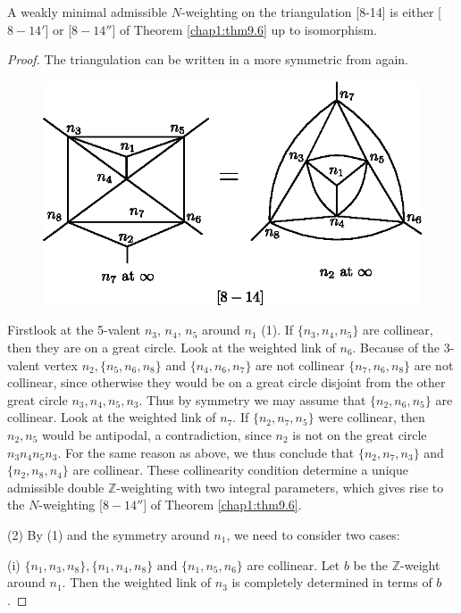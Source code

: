 \begin{lemma}\label{chap1:lem9.21}
A weakly minimal admissible $N$-weighting on the triangulation [8-14]
is either [$8-14'$] or [$8-14''$] of Theorem \ref{chap1:thm9.6} up to
isomorphism.  
\end{lemma}

\begin{proof}
The triangulation can be written in a more symmetric from again. 
\begin{figure}[H]
\centering 
\includegraphics[scale=0.75]{vol58-fig/fig58-56.eps} 
\end{figure}

First\pageoriginale  look at the 5-valent $n_3$, $n_4$, $n_5$ around
$n_1$ (1). If $\{n_3, 
n_4, n_5\}$ are collinear, then they are on a great circle. Look at
the weighted link of $n_6$. Because of the 3-valent vertex $n_2,
\{n_5, n_6, n_8\}$ and $\{n_4, n_6, n_7\}$ are not collinear $\{n_7,
n_6, n_8\}$ are not collinear, since otherwise they would be on a
great circle disjoint from the other great circle $n_3, n_4, n_5,
n_3$. Thus by  symmetry we may assume that $\{n_2, n_6, n_5 \}$ are
collinear. Look at the weighted link of $n_7$. If $\{n_2, n_7, n_5 \}$
were collinear, then $n_2, n_5$ would be antipodal, a contradiction,
since $n_2$ is not on the great circle $n_3 n_4 n_5 n_3$. For the same
reason as above, we thus conclude that $\{n_2, n_7, n_3\}$ and $\{n_2,
n_8, n_4\}$ are collinear. These collinearity condition determine a
unique admissible double $\mathbb{Z}$-weighting with two integral
parameters, which gives rise to the $N$-weighting [$8-14''$] of Theorem
\ref{chap1:thm9.6}.  

(2) By (1) and the symmetry around $n_1$, we need to consider two
cases: 

(i) $\{n_1, n_3, n_8\}, \{n_1, n_4, n_8\} \text{ and }\{n_1, n_5,
n_6\}$ are collinear. Let $b$ be the $\mathbb{Z}$-weight around
$n_1$. Then the weighted link of $n_3$ is completely determined in
terms of $b$. 


\end{proof}
